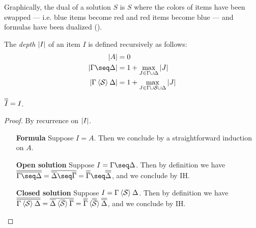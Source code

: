 Graphically, the dual of a solution $S$ is $S$ where the colors of items have
been swapped --- i.e. blue items become red and red items become blue --- and
formulas have been dualized ().

\begin{definition}
  The \emph{depth} $\left|I\right|$ of an item $I$ is defined recursively as
  follows:
  \begin{align*}
    \soldepth{A} &= 0 \\
    \soldepth{\Gamma \seq \Delta} &= 1 + \max_{J \in \Gamma \cup \Delta}{\soldepth{J}} \\
    \soldepth{\Gamma \piq{\cS} \Delta} &= 1 + \max_{J \in \Gamma \cup \cS \cup \Delta}{\soldepth{J}}
  \end{align*}
\end{definition}

\begin{lemma}[Involutivity]
  $\overline{\overline{I}} = I$.
\end{lemma}
\begin{proof}
  By recurrence on $\left|I\right|$.
  \begin{itemize}
    \item[\textbf{Formula}] Suppose $I = A$. Then we conclude by a
    straightforward induction on $A$.
    \item[\textbf{Open solution}] Suppose $I = \Gamma \seq \Delta$. Then by
    definition we have $\soldual{\soldual{\Gamma \seq \Delta}} =
    \soldual{\soldual{\Delta} \seq \soldual{\Gamma}} =
    \soldual{\soldual{\Gamma}} \seq \soldual{\soldual{\Delta}}$, and we conclude
    by IH.
    \item[\textbf{Closed solution}] Suppose $I = \Gamma \mathbin{\langle \mathcal{S} \rangle}
    \Delta$. Then by definition we have $\overline{\overline{\Gamma
    \mathbin{\langle \mathcal{S} \rangle} \Delta}} = \overline{\overline{\Delta}
    \mathbin{\langle \overline{\mathcal{S}} \rangle} \overline{\Gamma}} =
    \overline{\overline{\Gamma}} \mathbin{\langle \overline{\overline{\mathcal{S}}} \rangle}
    \overline{\overline{\Delta}}$, and we conclude by IH.
  \end{itemize}
\end{proof}

